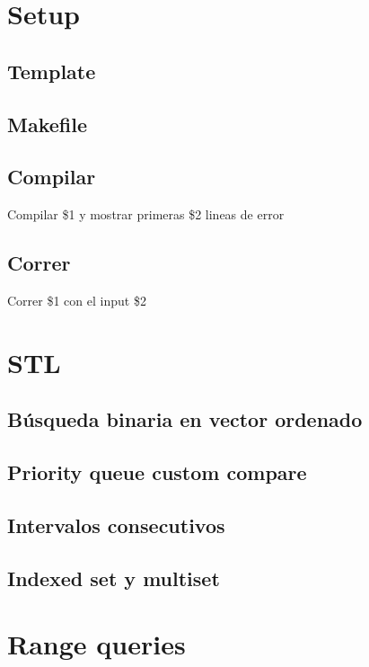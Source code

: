 

\def\title{Notebook}
\tableofcontents\newpage


\section{Setup}
    \subsection{Template}
    \subsection{Makefile}
        
    \subsection{Compilar}
        Compilar \$1 y mostrar primeras \$2 lineas de error
        
    \subsection{Correr}
        Correr \$1 con el input \$2
        

\section{STL}
    \subsection{Búsqueda binaria en vector ordenado}
    \subsection{Priority queue custom compare}
    \subsection{Intervalos consecutivos}
    \subsection{Indexed set y multiset}
        
\section{Range queries}
